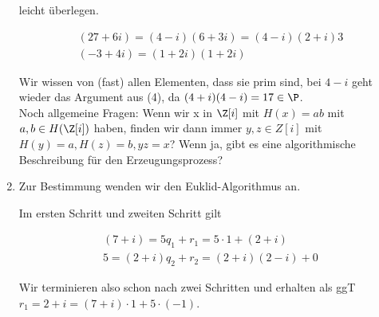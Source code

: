 \begin{solution}
\begin{enumerate}
  leicht überlegen.

  \begin{align*}
    (27+6i) = (4-i)(6+3i) = (4-i)(2+i)3 \\
    (-3+4i) = (1+2i)(1+2i)
  \end{align*}

  Wir wissen von (fast) allen Elementen, dass sie prim sind, bei $4-i$ geht wieder das Argument aus (4),
  da $(4+i)(4-i) = 17 \in \P$. \\
  Noch allgemeine Fragen: Wenn wir x in $\Z[i]$ mit $H(x) = ab$ mit $a,b \in H(\Z[i])$ haben,
  finden wir dann immer $y,z \in Z[i]$ mit $H(y) = a, H(z) = b, yz = x$? Wenn ja,
  gibt es eine algorithmische Beschreibung für den Erzeugungsprozess?

  \item Zur Bestimmung wenden wir den Euklid-Algorithmus an.

  Im ersten Schritt und zweiten Schritt gilt

  \begin{align*}
    (7+i) = 5 q_1 + r_1 = 5 \cdot 1 + (2+i) \\
    5 = (2+i)q_2 + r_2 = (2+i)(2-i) + 0
  \end{align*}

  Wir terminieren also schon nach zwei Schritten und erhalten als ggT $r_1 = 2+i = (7+i) \cdot 1 + 5 \cdot (-1)$.


\end{enumerate}

\end{solution}
